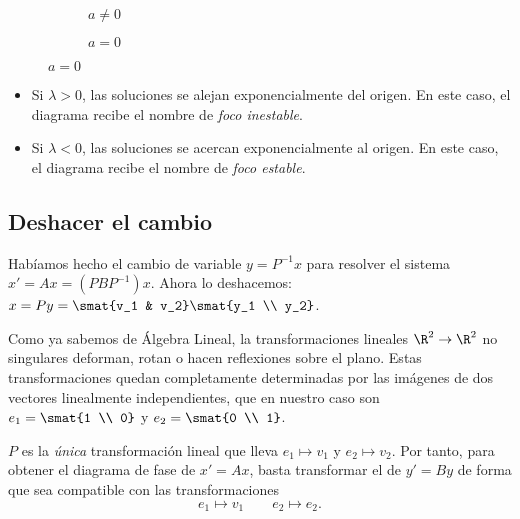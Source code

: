 \documentclass[../main.tex]{subfiles}
\begin{document}
\begin{figure}[ht]
  \centering
  \begin{subfigure}{0.5\textwidth}
    \centering
    \caption*{\(a \neq 0\)}
  \end{subfigure}%
  \begin{subfigure}{0.5\textwidth}
    \centering
    \caption*{\(a = 0\)}
  \end{subfigure}
\end{figure}

\begin{itemize}
\item Si \(\lambda > 0\), las soluciones se alejan exponencialmente del
  origen. En este caso, el diagrama recibe el nombre de \emph{foco inestable}.
\item Si \(\lambda < 0\), las soluciones se acercan exponencialmente al
  origen. En este caso, el diagrama recibe el nombre de \emph{foco estable}.
\end{itemize}

\subsection{Deshacer el cambio}
Habíamos hecho el cambio de variable \(y = P^{-1}x\) para resolver el sistema
\(x' = Ax = (PBP^{-1})x\). Ahora lo deshacemos: \(x = Py = \smat{v_1 & v_2}
\smat{y_1 \\ y_2}\).

Como ya sabemos de Álgebra Lineal, la transformaciones lineales
\(\R^2 \to \R^2\) no singulares deforman, rotan o hacen reflexiones sobre el
plano. Estas transformaciones quedan completamente determinadas por las imágenes de
dos vectores linealmente independientes, que en nuestro caso son \(e_1 = \smat{1
  \\ 0}\) y \(e_2 = \smat{0 \\ 1}\).

\(P\) es la \emph{única} transformación lineal que lleva \(e_1 \mapsto v_1\) y
\(e_2 \mapsto v_2\). Por tanto, para obtener el diagrama de fase de \(x' = Ax\),
basta transformar el de \(y' = By\) de forma que sea compatible con las
transformaciones
\[e_1 \mapsto v_1 \qquad e_2 \mapsto e_2.\]
\end{document}
